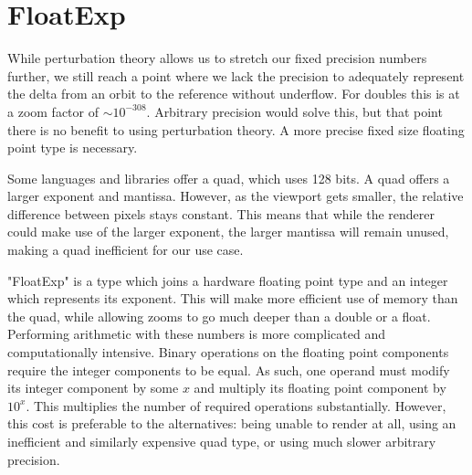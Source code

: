 \documentclass{article}
\begin{document}
\section{FloatExp}
\par While perturbation theory allows us to stretch our fixed precision numbers further, we still reach a point where we lack the precision to adequately represent the delta from an orbit to the reference without underflow. For doubles this is at a zoom factor of $\sim 10^{-308}$. Arbitrary precision would solve this, but that point there is no benefit to using perturbation theory. A more precise fixed size floating point type is necessary.
\par Some languages and libraries offer a quad, which uses 128 bits. A quad offers a larger exponent and mantissa. However, as the viewport gets smaller, the relative difference between pixels stays constant. This means that while the renderer could make use of the larger exponent, the larger mantissa will remain unused, making a quad inefficient for our use case.
\par "FloatExp" is a type which joins a hardware floating point type and an integer which represents its exponent. This will make more efficient use of memory than the quad, while allowing zooms to go much deeper than a double or a float. Performing arithmetic with these numbers is more complicated and computationally intensive. Binary operations on the floating point components require the integer components to be equal. As such, one operand must modify its integer component by some $x$ and multiply its floating point component by $10^x$. This multiplies the number of required operations substantially. However, this cost is preferable to the alternatives: being unable to render at all, using an inefficient and similarly expensive quad type, or using much slower arbitrary precision.\cite{UnknownFloatExp}
\end{document}
